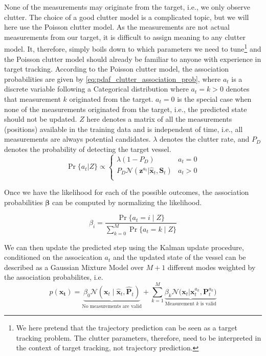 None of the measurements may originate from the target, i.e., we only observe clutter. The choice of a good clutter model is a complicated topic, but we will here use the Poisson clutter model. As the measurements are not actual measurements from our target, it is difficult to assign meaning to any clutter model. It, therefore, simply boils down to which parameters we need to tune\footnote{We here pretend that the trajectory prediction can be seen as a target tracking problem. The clutter parameters, therefore, need to be interpreted in the context of target tracking, not trajectory prediction.} and the Poisson clutter model should already be familiar to anyone with experience in target tracking.
According to the Poisson clutter model, the association probabilities are given by \cref{eq:pdaf_clutter_association_prob}, where $a_t$ is a discrete variable following a Categorical distribution where $a_t=k > 0$ denotes that measurement $k$ originated from the target. $a_t = 0$ is the special case when none of the measurements originated from the target, i.e., the predicted state should not be updated. $Z$ here denotes a matrix of all the measurements (positions) available in the training data and is independent of time, i.e., all measurements are always potential candidates. $\lambda$ denotes the clutter rate, and $P_D$ denotes the probability of detecting the target vessel.
\begin{equation}\label{eq:pdaf_clutter_association_prob}
    \Pr\{a_t | Z\} \propto \begin{cases}
        \lambda (1 - P_D) &  a_t = 0\\
        P_D \mathcal{N} (\boldsymbol{z}^{a_t} | \hat{\boldsymbol{x}}_t, \boldsymbol{S}_t) & a_t > 0\\
    \end{cases}
\end{equation}

Once we have the likelihood for each of the possible outcomes, the association probabilities $\boldsymbol{\beta}$ can be computed by normalizing the likelihood. 

\begin{equation}
    \beta_i = \frac{\Pr\{a_t=i \; | \; Z\}}{\sum_{k=0}^M \Pr\{a_t=k \; | \; Z\}}
\end{equation}

We can then update the predicted step using the Kalman update procedure, conditioned on the assocication $a_t$ and the updated state of the vessel can be described as a Gaussian Mixture Model over $M+1$ different modes weighted by the association probabilites, i.e. 
\begin{equation}
    p(\boldsymbol{x_t}) = \underbrace{\beta_0 \mathcal{N}(\boldsymbol{x}_t \; | \; \hat{\boldsymbol{x}}_t, \hat{\boldsymbol{P}}_t)}_{\text{No measurements are valid}} + \sum_{k=1}^M \underbrace{\beta_k \mathcal{N}\big(\boldsymbol{x}_t | \boldsymbol{x}_t^{a_k}, \boldsymbol{P}_t^{a_k}\big)}_{\text{Measurement $k$ is valid}}
\end{equation}

